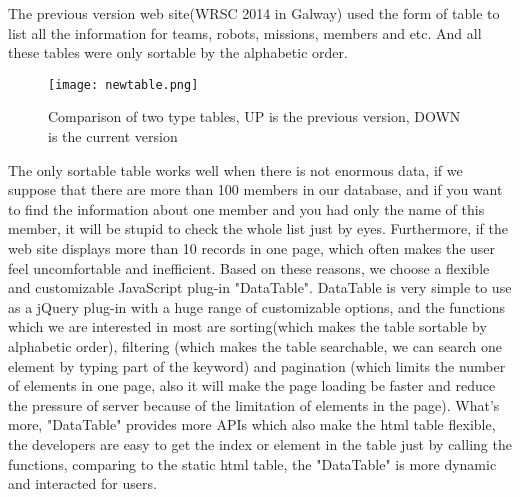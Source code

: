 The previous version web site(WRSC 2014 in Galway) used the form of table to list all the information for teams, robots, missions, members and etc. And all these tables were only sortable by the alphabetic order.
\begin{figure}[h!]
\centering
\texttt{[image: newtable.png]}
\caption{Comparison of two type tables, UP is the previous version, DOWN is the current version}
\label{fig-sample}
\end{figure}
The only sortable table works well when there is not enormous data, if we suppose that there are more than 100 members in our database, and if you want to find the information about one member and you had only the name of this member, it will be stupid to check the whole list just by eyes. Furthermore, if the web site displays more than 10 records in one page, which often makes the user feel uncomfortable and inefficient. Based on these reasons, we choose a flexible and customizable JavaScript plug-in "DataTable". DataTable is very simple to use as a jQuery plug-in with a huge range of customizable options, and the functions which we are interested in most are sorting(which makes the table sortable by alphabetic order), filtering (which makes the table searchable, we can search one element by typing part of the keyword) and pagination (which limits the number of elements in one page, also it will make the page loading be faster and reduce the pressure of server because of the limitation of elements in the page). What's more, "DataTable" provides more APIs which also make the html table flexible, the developers are easy to get the index or element in the table just by calling the functions, comparing to the static html table, the "DataTable" is more dynamic and interacted for users.

